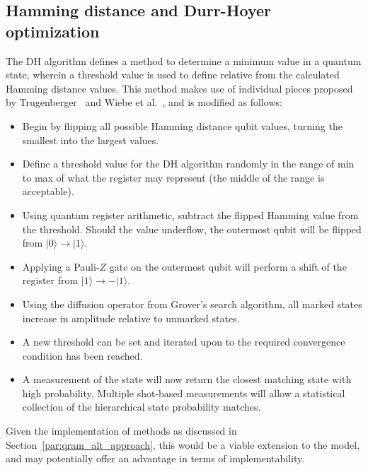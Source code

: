 \begin{appendices}
\section{Hamming distance and Durr-Hoyer optimization}\label{app:hamming_dh}
The DH algorithm defines a method to determine a minimum value in a quantum state, wherein a threshold value is used to define relative from the calculated Hamming distance values. This method makes use of individual pieces proposed by Trugenberger~\cite{Trugenberger_2001,Trugenberger_2002} and Wiebe et al.~\cite{Wiebe_Kapoor_Svore_2014}, and is modified as follows:

\begin{itemize}
\item Begin by flipping all possible Hamming distance qubit values, turning the smallest into the largest values.
\item Define a threshold value for the DH algorithm randomly in the range of min to max of what the register may represent (the middle of the range is acceptable).
\item Using quantum register arithmetic, subtract the flipped Hamming value from the threshold. Should the value underflow, the outermost qubit will be flipped from $\vert0\rangle\rightarrow \vert 1\rangle$.
\item Applying a Pauli-$Z$ gate on the outermost qubit will perform a shift of the register from $\vert 1\rangle\rightarrow -\vert 1\rangle$.
\item Using the diffusion operator from Grover's search algorithm, all marked states increase in amplitude relative to unmarked states.
\item A new threshold can be set and iterated upon to the required convergence condition has been reached.
\item A measurement of the state will now return the closest matching state with high probability, Multiple shot-based measurements will allow a statistical collection of the hierarchical state probability matches.
\end{itemize}
Given the implementation of methods as discussed in Section~\ref{par:qram_alt_approach}, this would be a viable extension to the model, and may potentially offer an advantage in terms of implementability.


\end{appendices}
